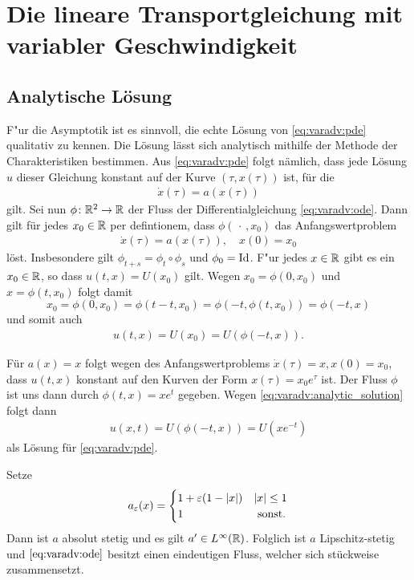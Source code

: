 
\section{Die lineare Transportgleichung mit variabler Geschwindigkeit}

\label{sec:analyt}
\subsection{Analytische Lösung}

F"ur die Asymptotik ist es sinnvoll, die echte Lösung von \eqref{eq:varadv:pde} qualitativ zu kennen.
Die Lösung lässt sich analytisch mithilfe der Methode der Charakteristiken bestimmen.
Aus \eqref{eq:varadv:pde} folgt nämlich, dass jede Lösung $u$ dieser Gleichung konstant auf der Kurve $(\tau, x(\tau))$ ist, für die
\begin{align} \label{eq:varadv:ode}
\dot x(\tau) = a(x(\tau))
\end{align} gilt.
Sei nun $\phi\colon \mathbb R^2 \to \mathbb R$ der Fluss der Differentialgleichung \eqref{eq:varadv:ode}.
Dann gilt für jedes $x_0 \in \mathbb R$ per defintionem, dass $\phi(\, \cdot \,,x_0)$ das Anfangswertproblem \begin{align}\label{eq:varadv:ivp} \dot x(\tau) = a(x(\tau)), \quad x(0) = x_0 \end{align} löst.
Insbesondere gilt $\phi_{t+s} = \phi_t \circ \phi_s$ und $\phi_0 = \operatorname{Id}$.
F"ur jedes $x \in \mathbb R$ gibt es ein $x_0 \in \mathbb R$, so dass $u(t,x) = U(x_0)$ gilt.
Wegen $x_0 = \phi(0,x_0)$ und $x = \phi(t, x_0)$ folgt damit \[ x_0 = \phi(0, x_0) = \phi(t - t, x_0) = \phi(-t, \phi(t, x_0)) = \phi(-t, x) \] und somit auch \begin{align}\label{eq:varadv:analytic_solution} u(t,x) = U(x_0) = U(\phi(-t, x)).\end{align}

\begin{example}
Für $a(x) = x$ folgt wegen des Anfangswertproblems $\dot x(\tau) = x, x(0) = x_0$, dass $u(t,x)$ konstant auf den Kurven der Form $x(\tau) = x_0 e^{\tau}$ ist.
Der Fluss $\phi$ ist uns dann durch $\phi(t,x) = x e^t$ gegeben. Wegen \eqref{eq:varadv:analytic_solution} folgt dann 
\begin{align}
u(x,t) = U(\phi(-t,x)) = U(x e^{-t})
\end{align}
als Lösung für \eqref{eq:varadv:pde}.
\\
\end{example}
\begin{example} \label{ex:varadv:hat}
Setze
\begin{align}
a_\varepsilon(x) = \begin{cases} 
    1 + \varepsilon (1 - \left| x \right|) & \left| x \right| \leq 1\\
    1 & \text{ sonst.}
\end{cases}
\end{align}
Dann ist $a$ absolut stetig und es gilt $a' \in L^\infty(\mathbb R)$.
Folglich ist $a$ Lipschitz-stetig und $\eqref{eq:varadv:ode}$ besitzt einen eindeutigen Fluss, welcher sich stückweise zusammensetzt.
\end{example}

